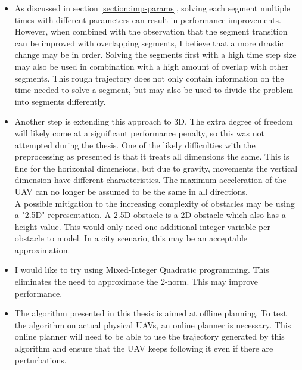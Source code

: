 \begin{itemize}
\item As discussed in section \ref{section:imp-params}, solving each segment multiple times with different parameters can result in performance improvements. However, when combined with the observation that the segment transition can be improved with overlapping segments, I believe that a more drastic change may be in order. Solving the segments first with a high time step size may also be used in combination with a high amount of overlap with other segments. This rough trajectory does not only contain information on the time needed to solve a segment, but may also be used to divide the problem into segments differently.
\item Another step is extending this approach to 3D. The extra degree of freedom will likely come at a significant performance penalty, so this was not attempted during the thesis. One of the likely difficulties with the preprocessing as presented is that it treats all dimensions the same. This is fine for the horizontal dimensions, but due to gravity, movements the vertical dimension have different characteristics. The maximum acceleration of the UAV can no longer be assumed to be the same in all directions.\\
A possible mitigation to the increasing complexity of obstacles may be using a "2.5D" representation. A 2.5D obstacle is a 2D obstacle which also has a height value. This would only need one additional integer variable per obstacle to model. In a city scenario, this may be an acceptable approximation.
\item I would like to try using Mixed-Integer Quadratic programming. This eliminates the need to approximate the 2-norm. This may improve performance. \\
\item The algorithm presented in this thesis is aimed at offline planning. To test the algorithm on actual physical UAVs, an online planner is necessary. This online planner will need to be able to use the trajectory generated by this algorithm and ensure that the UAV keeps following it even if there are perturbations.
\end{itemize}

